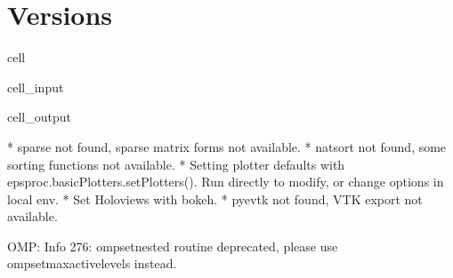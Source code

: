 \documentclass[letterpaper,table,10pt,english]{jupyterBook}
\begin{document}
\section{Versions}
\label{\detokenize{tests/build_versions_checks:versions}}
\begin{sphinxuseclass}{cell}\begin{sphinxVerbatimInput}

\begin{sphinxuseclass}{cell_input}
\begin{sphinxVerbatim}[commandchars=\\\{\}]
 
\PYG{p}{[}   \PYG{p}{]}
\end{sphinxVerbatim}

\end{sphinxuseclass}\end{sphinxVerbatimInput}
\begin{sphinxVerbatimOutput}

\begin{sphinxuseclass}{cell_output}
\begin{sphinxVerbatim}[commandchars=\\\{\}]
* sparse not found, sparse matrix forms not available. 
* natsort not found, some sorting functions not available. 
* Setting plotter defaults with epsproc.basicPlotters.setPlotters(). Run directly to modify, or change options in local env.
* Set Holoviews with bokeh.
* pyevtk not found, VTK export not available. 
\end{sphinxVerbatim}

\begin{sphinxVerbatim}[commandchars=\\\{\}]
OMP: Info \PYGZsh{}276: omp\PYGZus{}set\PYGZus{}nested routine deprecated, please use omp\PYGZus{}set\PYGZus{}max\PYGZus{}active\PYGZus{}levels instead.
\end{sphinxVerbatim}


\end{sphinxuseclass}
\end{sphinxVerbatimOutput}
\end{sphinxuseclass}
\end{document}
